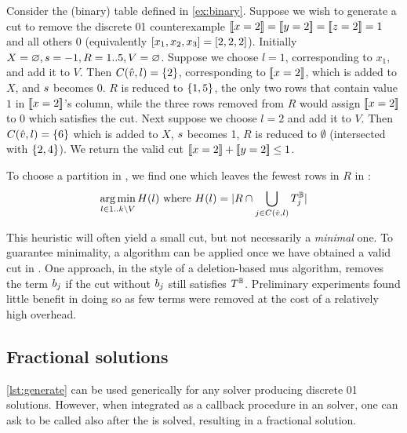 \documentclass[a4paper,UKenglish,cleveref,autoref,thm-restate]{lipics-v2021}
\begin{document}
\begin{example}
\label{ex:frac}
   Consider the (binary) table defined in \cref{ex:binary}.
Suppose we wish to generate a cut to 
remove the discrete 01 counterexample $\be{1}{2} = \be{2}{2} = \be{3}{2} = 1$ and all others $0$ (equivalently $[x_1,x_2,x_3] = [2,2,2]$).
Initially $X = \varnothing, s = -1, R = 1..5, V = \varnothing$.
Suppose we choose $l = 1$, corresponding to $x_1$, and add it to $V$.
Then $C(\hat{v},l) = \{2\}$, corresponding to $\be{1}{2}$, which is added to $X$, and $s$ becomes 0. 
$R$ is reduced to $\{1,5\}$, the only two rows that contain value $1$ in $\be{1}{2}$'s column, while the three rows removed from $R$ would assign $\be{1}{2}$ to $0$ which satisfies the cut.
Next suppose we choose $l = 2$ and add it to $V$.
Then $C(\hat{v},l) = \{6\}$ which is added to $X$, $s$ becomes 1,
$R$ is reduced to $\emptyset$ (intersected with 
$\{2,4\}$).
We return the valid cut
$\be{1}{2} + \be{2}{2} \leq 1$.
\end{example}

To choose a partition in , we find one which leaves the fewest rows in $R$ in :
\begin{equation}
\label{eq:greedy}
\operatorname*{arg\,min}_{l \in 1..k \setminus V} H(l)
\text{~where~}
H(l) = |R \cap \bigcup_{j \in C(\hat{v}, l)} T^{\mathbb{B}}_j|
\end{equation}

This heuristic will often yield a small cut, but not necessarily a \textit{minimal} one.
To guarantee minimality, a \lazyShrink algorithm can be applied once we have obtained a valid cut in .
One approach, in the style of a deletion-based \acrlong{mus} algorithm, removes the term $b_j$ if the cut without $b_j$ still satisfies $T^{\mathbb{B}}$.
Preliminary experiments found little benefit in doing so as few terms were removed at the cost of a relatively high overhead.

\subsection{Fractional solutions}
\label{sec:cuts:fractional}


\cref{lst:generate} can be used generically for any solver producing discrete 01 solutions.
However, when integrated as a callback procedure in an \milp solver, one can ask to be called also after the \relaxation is solved, resulting in a fractional solution.
\end{document}
